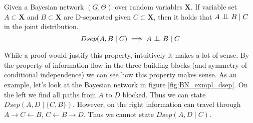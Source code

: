 \begin{prop}
Given a Bayesian network $(G, \Theta)$ over random variables
$\textbf{X}$. If variable set $A\subset \textbf{X}$ and 
$B\subset \textbf{X}$ are D-separated given $C \subset \textbf{X}$,
then it holds that $A \CI B \mid C$ in the joint distribution.
\begin{equation}
Dsep(A, B \mid C) \implies A \CI B \mid C
\end{equation}
\end{prop}

\noindent
While a proof would justify this property, intuitively it
makes a lot of sense. By the property of information flow 
in the three building blocks (and symmetry of conditional
independence) we can see how this property makes sense.
As an example, let's look at the Bayesian network in figure
\ref{fig:BN_exmpl_dsep}. On the left we find all paths from
$A$ to $D$ blocked. Thus we can state $Dsep(A, D \mid \{C, B\})$.
However, on the right information can travel through 
$A \rightarrow C \leftarrow B$, $C \leftarrow B \rightarrow D$.
Thus we cannot state $Dsep(A, D \mid C)$.

